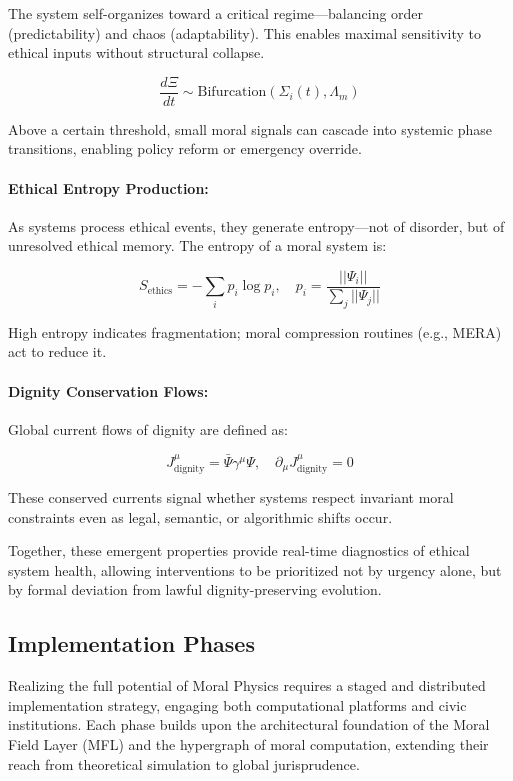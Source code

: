 \documentclass[12]{amsart}
\theoremstyle{plain}
\begin{document}
The system self-organizes toward a critical regime—balancing order (predictability) and chaos (adaptability). This enables maximal sensitivity to ethical inputs without structural collapse.

\[
\frac{d\Xi}{dt} \sim \text{Bifurcation}(\Sigma_i(t), \Lambda_m)
\]

Above a certain threshold, small moral signals can cascade into systemic phase transitions, enabling policy reform or emergency override.

\paragraph{Ethical Entropy Production:}

As systems process ethical events, they generate entropy—not of disorder, but of unresolved ethical memory. The entropy of a moral system is:

\[
S_{\text{ethics}} = -\sum_i p_i \log p_i, \quad p_i = \frac{||\Psi_i||}{\sum_j ||\Psi_j||}
\]

High entropy indicates fragmentation; moral compression routines (e.g., MERA) act to reduce it.

\paragraph{Dignity Conservation Flows:}

Global current flows of dignity are defined as:

\[
J^\mu_{\text{dignity}} = \bar{\Psi} \gamma^\mu \Psi, \quad \partial_\mu J^\mu_{\text{dignity}} = 0
\]

These conserved currents signal whether systems respect invariant moral constraints even as legal, semantic, or algorithmic shifts occur.

\bigskip

Together, these emergent properties provide real-time diagnostics of ethical system health, allowing interventions to be prioritized not by urgency alone, but by formal deviation from lawful dignity-preserving evolution.

\subsection{Implementation Phases}

Realizing the full potential of Moral Physics requires a staged and distributed implementation strategy, engaging both computational platforms and civic institutions. Each phase builds upon the architectural foundation of the Moral Field Layer (MFL) and the hypergraph of moral computation, extending their reach from theoretical simulation to global jurisprudence.
\end{document}
